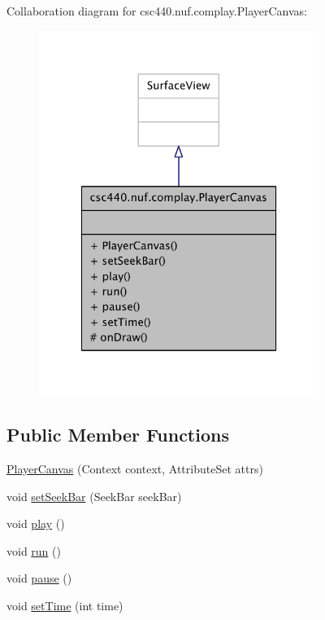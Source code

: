 Collaboration diagram for csc440.\-nuf.\-complay.\-Player\-Canvas\-:
\nopagebreak
\begin{figure}[H]
\begin{center}
\leavevmode
\includegraphics[width=258pt]{classcsc440_1_1nuf_1_1complay_1_1_player_canvas__coll__graph}
\end{center}
\end{figure}
\subsection*{Public Member Functions}
\begin{DoxyCompactItemize}
\item 
\hyperlink{classcsc440_1_1nuf_1_1complay_1_1_player_canvas_ae8e4a5d566c323f8b7e8d9cece4fe07c}{Player\-Canvas} (Context context, Attribute\-Set attrs)
\item 
void \hyperlink{classcsc440_1_1nuf_1_1complay_1_1_player_canvas_ab0dcca93b23d621e1d3d353ecd95a215}{set\-Seek\-Bar} (Seek\-Bar seek\-Bar)
\item 
void \hyperlink{classcsc440_1_1nuf_1_1complay_1_1_player_canvas_a1d41cf44dc0cb2c075744299c9867903}{play} ()
\item 
void \hyperlink{classcsc440_1_1nuf_1_1complay_1_1_player_canvas_aa0797d703af20d0ada15e590da003617}{run} ()
\item 
void \hyperlink{classcsc440_1_1nuf_1_1complay_1_1_player_canvas_ab280f6a822b63f5aa82300ebdec8dccf}{pause} ()
\item 
void \hyperlink{classcsc440_1_1nuf_1_1complay_1_1_player_canvas_a64eae2e9ed26456ab5b104436c97d78f}{set\-Time} (int time)
\end{DoxyCompactItemize}
